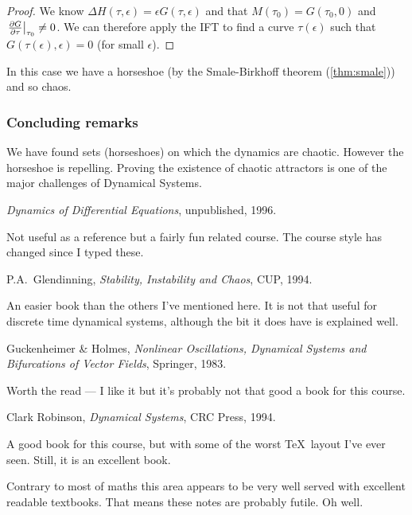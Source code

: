 \documentclass{notes}
\theoremstyle{plain}
\begin{document}
\begin{proof}
  We know $\Delta H(\tau,\epsilon) = \epsilon G(\tau,\epsilon)$ and
  that $M(\tau_0) = G(\tau_0,0)$ and
  $\left.\frac{\partial G}{\partial \tau}\right|_{\tau_0} \neq 0$.  We can therefore apply
  the IFT to find a curve $\tau(\epsilon)$ such that
  $G(\tau(\epsilon),\epsilon) = 0$ (for small $\epsilon$).
\end{proof}

In this case we have a horseshoe (by the Smale-Birkhoff theorem
(\ref{thm:smale})) and so chaos.

\subsubsection*{Concluding remarks}

We have found sets (horseshoes) on which the dynamics are chaotic.
However the horseshoe is repelling.  Proving the existence of chaotic
attractors is one of the major challenges of Dynamical Systems.

\backmatter

\begin{thebibliography}{9}
 \emph{Dynamics of Differential Equations},
  unpublished, 1996.
  
  {\sffamily \small Not useful as a reference but a fairly fun related
  course.  The course style has changed since I typed these. }

 P.A.~Glendinning, \emph{Stability, Instability
    and Chaos}, CUP, 1994.
  
  {\sffamily \small An easier book than the others I've mentioned
 here.  It is not that useful for discrete time dynamical systems,
 although the bit it does have is explained well. }

 Guckenheimer \& Holmes, \emph{Nonlinear Oscillations,
    Dynamical Systems and Bifurcations of Vector Fields}, Springer,
  1983.
  
  {\sffamily \small Worth the read --- I like it but it's probably not
    that good a book for this course. }

 Clark Robinson, \emph{Dynamical Systems}, CRC
  Press, 1994.
  
  { \sffamily \small A good book for this course, but with some of the
  worst \TeX\ layout I've ever seen.  Still, it is an excellent book.}
\end{thebibliography}

Contrary to most of maths this area appears to be very well served
with excellent readable textbooks.  That means these notes are
probably futile.  Oh well.
\end{document}
